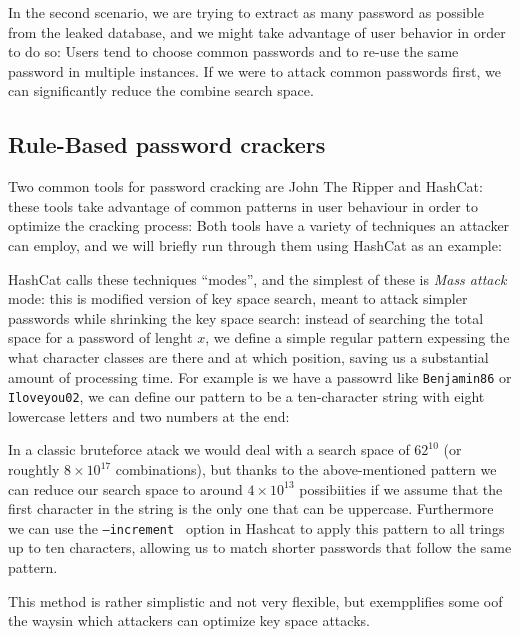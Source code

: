 In the second scenario, we are trying to extract as many password as possible from the leaked database, and we might take advantage of user behavior in order to do so: Users tend to choose common passwords and to re-use the same password in multiple instances. If we were to attack common passwords first, we can significantly reduce the combine search space.

\subsection{Rule-Based password crackers}

Two common tools for password cracking are John The Ripper and \break \mbox{HashCat}\cite{john,hash_cat}: these tools take advantage of common patterns in user behaviour in order to optimize the cracking process:  Both tools have a variety of techniques an attacker can employ, and we will briefly run through them using HashCat as an example: \newline

HashCat calls these techniques \enquote{modes}, and the simplest of these is \emph{Mass attack} mode: this is modified version of key space search, meant to attack simpler passwords while shrinking the key space search: instead of searching the total space for a password of lenght $x$, we define a simple regular pattern expessing the what character classes are there and at which position, saving us a substantial amount of processing time.
For example is we have a passowrd like \texttt{Benjamin86} or \texttt{Iloveyou02}, we can define our pattern to be a ten-character string with eight lowercase letters and two numbers at the end:

In a classic bruteforce atack we would deal with a search space of $62^{10}$ (or roughtly $8 \times 10^{17}$ combinations), but thanks to the above-mentioned pattern we can reduce our search space to around $4 \times 10^{13}$ possibiities if we assume that the first character in the string is the only one that can be uppercase.
Furthermore we can use the \texttt{--increment } option in Hashcat to apply this pattern to all trings up to ten characters, allowing us to match shorter passwords that follow the same pattern.

This method is rather simplistic and not very flexible, but exempplifies some oof the waysin which attackers can optimize key space attacks.\newline

